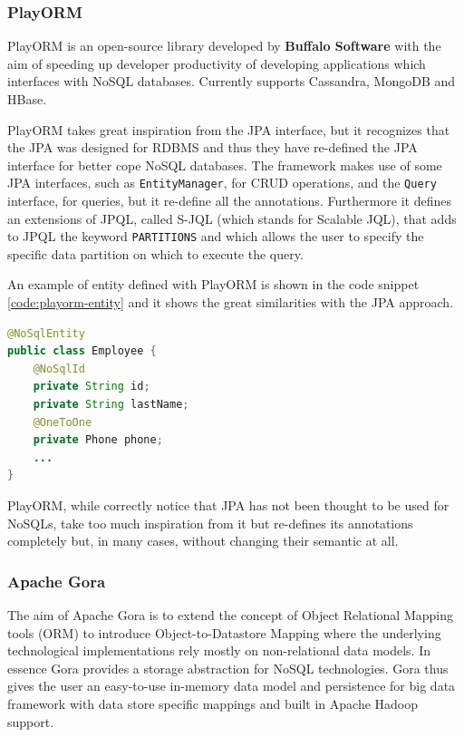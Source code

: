 \subsubsection{PlayORM}
PlayORM \cite{online:playorm} is an open-source library developed by \textbf{Buffalo Software} with the aim of speeding up developer productivity of developing applications which interfaces with NoSQL databases. Currently supports Cassandra, MongoDB and HBase. 

\noindent PlayORM takes great inspiration from the JPA interface, but it  recognizes that the JPA was designed for RDBMS and thus they have re-defined the JPA interface for better cope NoSQL databases.
The framework makes use of some JPA interfaces, such as \texttt{EntityManager}, for CRUD operations, and the \texttt{Query} interface, for queries, but it re-define all the annotations.
Furthermore it defines an extensions of JPQL, called S-JQL (which stands for Scalable JQL), that adds to JPQL the keyword \texttt{PARTITIONS} and which allows the user to specify the specific data partition on which to execute the query.

\noindent An example of entity defined with PlayORM is shown in the code snippet \ref{code:playorm-entity} and it shows the great similarities with the JPA approach.

\begin{lstlisting}[language=Java, caption=PlayORM object mapping, label=code:playorm-entity]
@NoSqlEntity
public class Employee {
    @NoSqlId
    private String id;
    private String lastName;
    @OneToOne
    private Phone phone;
    ...
}
\end{lstlisting}

\noindent PlayORM, while correctly notice that JPA has not been thought to be used for NoSQLs, take too much inspiration from it but re-defines its annotations completely but, in many cases, without changing their semantic at all.

\subsubsection{Apache Gora}
The aim of Apache Gora \cite{online:apache-gora} is to extend the concept of Object Relational Mapping tools (ORM) to introduce Object-to-Datastore Mapping where the underlying technological implementations rely mostly on non-relational data models. In essence Gora provides a storage abstraction for NoSQL technologies. 
Gora thus gives the user an easy-to-use in-memory data model and persistence for big data framework with data store specific mappings and built in Apache Hadoop support.

